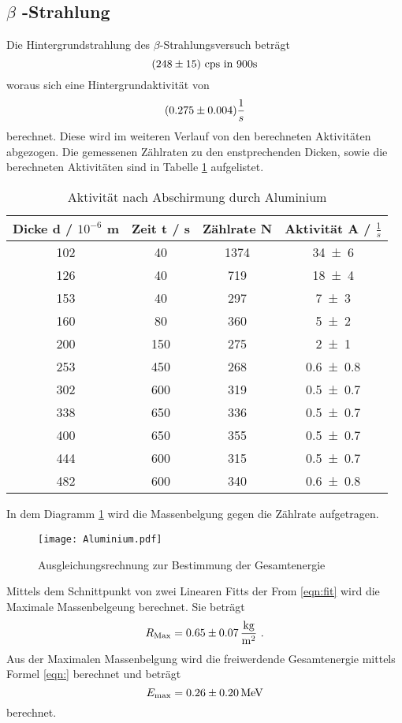 \subsection{\texorpdfstring{$\beta$ -Strahlung }%
                               {beta -Strahlung}}
Die Hintergrundstrahlung des $\beta$-Strahlungsversuch beträgt
\begin{equation}
  (\num{248 +- 15}) \text{ cps in } 900 \text{s}
  \label{eqn:hintb}
\end{equation}
woraus sich eine Hintergrundaktivität von
\begin{equation}
  (\num{0.275 +- 0.004}) \frac{1}{s}
  \label{eqn:HAB}
\end{equation}
berechnet. Diese wird im weiteren Verlauf von den berechneten Aktivitäten abgezogen. Die gemessenen Zählraten zu den enstprechenden Dicken, sowie die berechneten Aktivitäten sind in Tabelle \ref{tab:AAlu} aufgelistet.
\begin{table}
  \centering
  \begin{tabular}{c c c c}
    \toprule
    Dicke d / $10^{-6}$ m & Zeit t / s & Zählrate N & Aktivität A / $\frac{1}{s}$ \\
    \midrule
    102&	40 &	1374&	\num{34 +-6 } \\
    126&	40 &	719&	\num{18 +-4 } \\
    153&	40 &	297&	\num{7 +-3 } \\
    160&	80 &	360&	\num{5 +-2 } \\
    200&	150&	275&	\num{2 +-1 } \\
    253&	450&	268&	\num{0.6 +-0.8 } \\
    302&	600&	319&	\num{0.5 +-0.7 } \\
    338&	650&	336&	\num{0.5 +-0.7 } \\
    400&	650&	355&	\num{0.5 +-0.7 } \\
    444&	600&	315&	\num{0.5 +-0.7 } \\
    482&	600&	340&	\num{0.6 +-0.8 } \\
    \bottomrule
  \end{tabular}
  \caption{Aktivität nach Abschirmung durch Aluminium}
  \label{tab:AAlu}
\end{table}
In dem Diagramm \ref{fig:Alu} wird die Massenbelgung gegen die Zählrate aufgetragen.
\begin{figure}
  \centering
  \texttt{[image: Aluminium.pdf]}
  \caption{Ausgleichungsrechnung zur Bestimmung der Gesamtenergie}
  \label{fig:Alu}
\end{figure}
Mittels dem Schnittpunkt von zwei Linearen Fitts der From \eqref{eqn:fit} wird die Maximale Massenbelgeung berechnet. Sie beträgt
\begin{equation}
  R_\text{Max} = \num{0.65 +- 0.07} \, \frac{\text{kg}}{\text{m}^2} \ .
  \label{eqn:Rmax}
\end{equation}
Aus der Maximalen Massenbelgung wird die freiwerdende Gesamtenergie mittels Formel \eqref{eqn:} berechnet und beträgt
\begin{equation}
  E_\text{max} = \num{0.26 +- 0.2} \, \text{MeV}
  \label{eqn:max}
\end{equation}
berechnet.
